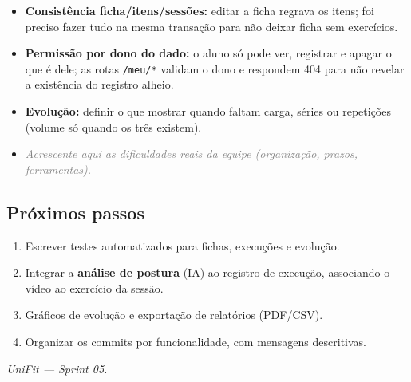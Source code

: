 \documentclass[11pt,a4paper,final]{article}
\newcommand{\cod}[1]{\texttt{#1}}
\newcommand{\preencher}[1]{\textit{\textcolor{gray}{#1}}}
\begin{document}
\begin{itemize}
  \item \textbf{Consistência ficha/itens/sessões:} editar a ficha regrava os itens; foi preciso fazer tudo na
        mesma transação para não deixar ficha sem exercícios.
  \item \textbf{Permissão por dono do dado:} o aluno só pode ver, registrar e apagar o que é dele; as rotas
        \cod{/meu/*} validam o dono e respondem 404 para não revelar a existência do registro alheio.
  \item \textbf{Evolução:} definir o que mostrar quando faltam carga, séries ou repetições (volume só quando
        os três existem).
  \item \preencher{Acrescente aqui as dificuldades reais da equipe (organização, prazos, ferramentas).}
\end{itemize}

\subsection{Próximos passos}

\begin{enumerate}
  \item Escrever testes automatizados para fichas, execuções e evolução.
  \item Integrar a \textbf{análise de postura} (IA) ao registro de execução, associando o vídeo ao exercício da sessão.
  \item Gráficos de evolução e exportação de relatórios (PDF/CSV).
  \item Organizar os commits por funcionalidade, com mensagens descritivas.
\end{enumerate}

\vfill
\begin{center}\small\itshape
 UniFit --- Sprint 05.
\end{center}
\end{document}
